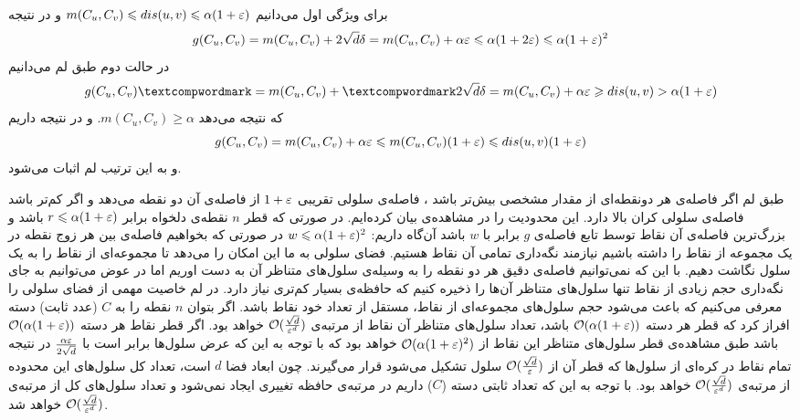 برای ویژگی اول می‌دانیم
$ m( C_u, C_v) \leqslant dis(u,v) \leqslant \alpha (1+\varepsilon)$
و در نتیجه
$$ g(C_u, C_v) = m(C_u, C_v) + 2 \sqrt{d} \delta = m(C_u, C_v) + \alpha \varepsilon \leqslant \alpha (1+ 2 \varepsilon) \leqslant \alpha (1 + \varepsilon)^2$$
در حالت دوم طبق لم  می‌دانیم
$$ g(C_u, C_v)‌ = m(C_u, C_v) +‌ 2\sqrt{d} \delta = m(C_u, C_v) + \alpha \eps  \ge dis(u, v) > \alpha (1 + \eps)$$
که نتیجه می‌دهد
$ m(C_u, C_v) \ge \alpha $.
و در نتیجه داریم 
$$ g(C_u, C_v) = m(C_u, C_v) + \alpha \varepsilon \leqslant m(C_u, C_v) (1+\varepsilon) \leqslant dis(u, v) (1 + \varepsilon)$$
و به این ترتیب لم اثبات می‌شود.

طبق لم  اگر فاصله‌ی هر دونقطه‌ای از مقدار مشخصی بیش‌تر باشد ، فاصله‌ی سلولی تقریبی $1+\varepsilon$ از فاصله‌ی آن دو نقطه می‌دهد و اگر کم‌تر باشد فاصله‌ی سلولی کران بالا دارد. این محدودیت را در مشاهده‌ی  بیان کرده‌ایم.
در صورتی که قطر $n$ نقطه‌ی دلخواه برابر 
$ r \leqslant \alpha (1+\varepsilon)$
باشد و بزرگ‌ترین فاصله‌ی آن نقاط توسط تابع فاصله‌ی $g$ برابر با $w$ باشد آن‌گاه داریم: 
$ w \leqslant \alpha (1+\varepsilon)^2 $ 
در صورتی که بخواهیم فاصله‌ی بین هر زوج نقطه در یک مجموعه از نقاط را داشته باشیم نیازمند نگه‌داری تمامی آن نقاط هستیم. فضای سلولی به ما این امکان را می‌دهد تا مجموعه‌ای از نقاط را به یک سلول نگاشت دهیم. با این که نمی‌توانیم فاصله‌ی دقیق هر دو نقطه را به وسیله‌ی سلول‌های متناظر آن به دست اوریم اما در عوض می‌توانیم به جای نگه‌داری حجم زیادی از نقاط تنها سلول‌های متناظر آن‌ها را ذخیره کنیم که حافظه‌ی بسیار کم‌تری نیاز دارد. در لم  خاصیت مهمی از فضای سلولی را معرفی می‌کنیم که باعث می‌شود حجم سلول‌های مجموعه‌ای از نقاط، مستقل از تعداد خود نقاط باشد.
اگر بتوان $n$ نقطه‌ را به $C$ (عدد ثابت) دسته‌ افراز کرد که قطر هر دسته 
$ \mathcal{O}(\alpha (1+\varepsilon)) $
باشد، تعداد سلول‌های متناظر آن نقاط از مرتبه‌ی
$ \mathcal{O}(\frac{\sqrt{d}}{\varepsilon^d})$ 
خواهد بود.
اگر قطر نقاط هر دسته 
$\mathcal{O}( \alpha (1+ \varepsilon))$
باشد طبق مشاهده‌ی  قطر سلول‌های متناظر این نقاط از 
$\mathcal{O}( \alpha (1+\varepsilon)^2)$
خواهد بود که با توجه به این که عرض سلول‌ها برابر است با
$ \frac{\alpha \varepsilon}{2 \sqrt{d}}$
در نتیجه تمام نقاط در کره‌ای از سلول‌ها که قطر آن از 
$ \mathcal{O}(\frac{\sqrt{d}}{\varepsilon})$
سلول تشکیل می‌شود قرار می‌گیرند. چون ابعاد فضا $d$ است، تعداد کل سلول‌های این محدوده از مرتبه‌ی
$ \mathcal{O}(\frac{\sqrt{d}}{\varepsilon^d})$ 
خواهد بود. با توجه به این که تعداد ثابتی دسته ($C$) داریم در مرتبه‌ی حافظه تغییری ایجاد نمی‌شود و تعداد سلول‌های کل از مرتبه‌ی
$ \mathcal{O}(\frac{\sqrt{d}}{\varepsilon^d})$ 
خواهد شد.
